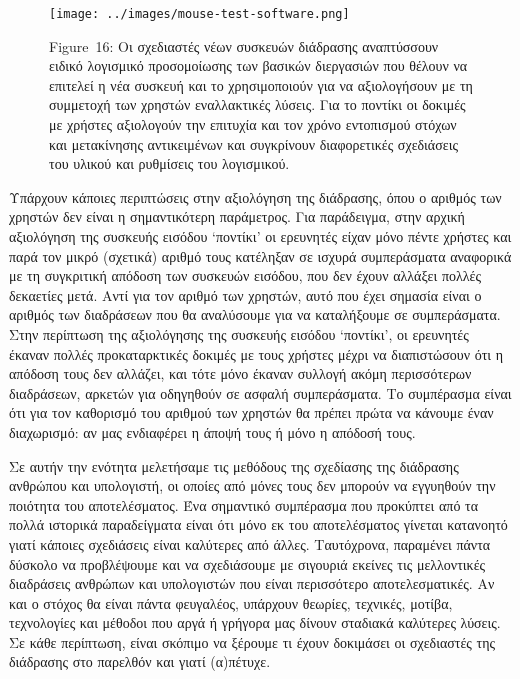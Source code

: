 \documentclass[
]{article}
\begin{document}
\leavevmode{}%
\begin{figure}
\hypertarget{fig:mouse-test-software}{%
\centering
\texttt{[image: ../images/mouse-test-software.png]}
\caption{Figure~16: Οι σχεδιαστές νέων συσκευών διάδρασης αναπτύσσουν
ειδικό λογισμικό προσομοίωσης των βασικών διεργασιών που θέλουν να
επιτελεί η νέα συσκευή και το χρησιμοποιούν για να αξιολογήσουν με τη
συμμετοχή των χρηστών εναλλακτικές λύσεις. Για το ποντίκι οι δοκιμές με
χρήστες αξιολογούν την επιτυχία και τον χρόνο εντοπισμού στόχων και
μετακίνησης αντικειμένων και συγκρίνουν διαφορετικές σχεδιάσεις του
υλικού και ρυθμίσεις του λογισμικού.}\label{fig:mouse-test-software}
}
\end{figure}

Υπάρχουν κάποιες περιπτώσεις στην αξιολόγηση της διάδρασης, όπου ο
αριθμός των χρηστών δεν είναι η σημαντικότερη παράμετρος. Για
παράδειγμα, στην αρχική αξιολόγηση της συσκευής εισόδου `ποντίκι' οι
ερευνητές είχαν μόνο πέντε χρήστες και παρά τον μικρό (σχετικά) αριθμό
τους κατέληξαν σε ισχυρά συμπεράσματα αναφορικά με τη συγκριτική απόδοση
των συσκευών εισόδου, που δεν έχουν αλλάξει πολλές δεκαετίες μετά. Αντί
για τον αριθμό των χρηστών, αυτό που έχει σημασία είναι ο αριθμός των
διαδράσεων που θα αναλύσουμε για να καταλήξουμε σε συμπεράσματα. Στην
περίπτωση της αξιολόγησης της συσκευής εισόδου `ποντίκι', οι ερευνητές
έκαναν πολλές προκαταρκτικές δοκιμές με τους χρήστες μέχρι να
διαπιστώσουν ότι η απόδοση τους δεν αλλάζει, και τότε μόνο έκαναν
συλλογή ακόμη περισσότερων διαδράσεων, αρκετών για οδηγηθούν σε ασφαλή
συμπεράσματα. Το συμπέρασμα είναι ότι για τον καθορισμό του αριθμού των
χρηστών θα πρέπει πρώτα να κάνουμε έναν διαχωρισμό: αν μας ενδιαφέρει η
άποψή τους ή μόνο η απόδοσή τους.

Σε αυτήν την ενότητα μελετήσαμε τις μεθόδους της σχεδίασης της διάδρασης
ανθρώπου και υπολογιστή, οι οποίες από μόνες τους δεν μπορούν να
εγγυηθούν την ποιότητα του αποτελέσματος. Ένα σημαντικό συμπέρασμα που
προκύπτει από τα πολλά ιστορικά παραδείγματα είναι ότι μόνο εκ του
αποτελέσματος γίνεται κατανοητό γιατί κάποιες σχεδιάσεις είναι καλύτερες
από άλλες. Ταυτόχρονα, παραμένει πάντα δύσκολο να προβλέψουμε και να
σχεδιάσουμε με σιγουριά εκείνες τις μελλοντικές διαδράσεις ανθρώπων και
υπολογιστών που είναι περισσότερο αποτελεσματικές. Αν και ο στόχος θα
είναι πάντα φευγαλέος, υπάρχουν θεωρίες, τεχνικές, μοτίβα, τεχνολογίες
και μέθοδοι που αργά ή γρήγορα μας δίνουν σταδιακά καλύτερες λύσεις. Σε
κάθε περίπτωση, είναι σκόπιμο να ξέρουμε τι έχουν δοκιμάσει οι
σχεδιαστές της διάδρασης στο παρελθόν και γιατί (α)πέτυχε.
\end{document}
